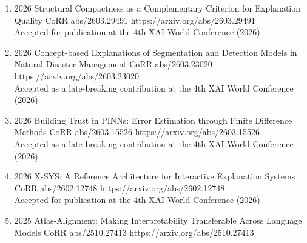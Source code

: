 {\begin{enumerate}
        \item {}
                        {2026}
                        {Structural Compactness as a Complementary Criterion for Explanation Quality}
                        {CoRR abs/2603.29491}
                        {https://arxiv.org/abs/2603.29491}
                        {
                            \\ Accepted for publication at the 4th XAI World Conference (2026)
                        }


        \item {}
                        {2026}
                        {Concept-based Explanations of Segmentation and Detection Models in Natural Disaster Management}
                        {CoRR abs/2603.23020}
                        {https://arxiv.org/abs/2603.23020}
                        {
                            \\ Accepted as a late-breaking contribution at the 4th XAI World Conference (2026)
                        }


        \item {}
                        {2026}
                        {Building Trust in PINNs: Error Estimation through Finite Difference Methods}
                        {CoRR abs/2603.15526}
                        {https://arxiv.org/abs/2603.15526}
                        {
                            \\ Accepted as a late-breaking contribution at the 4th XAI World Conference (2026)
                        }


        \item {}
                        {2026}
                        {X-SYS: A Reference Architecture for Interactive Explanation Systems}
                        {CoRR abs/2602.12748}
                        {https://arxiv.org/abs/2602.12748}
                        {
                            \\ Accepted for publication at the 4th XAI World Conference (2026)
                        }


        \item {}
                        {2025}
                        {Atlas-Alignment: Making Interpretability Transferable Across Language Models}
                        {CoRR abs/2510.27413}
                        {https://arxiv.org/abs/2510.27413}    
    

\end{enumerate}}
